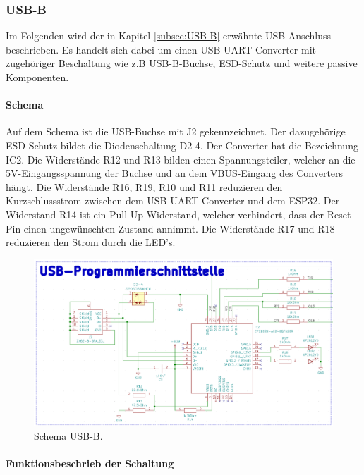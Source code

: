 \clearpage
\subsubsection{USB-B}
\label{subsubsec:USB-B}

Im Folgenden wird der in Kapitel \ref{subsec:USB-B} erwähnte USB-Anschluss beschrieben. Es handelt sich dabei um einen USB-UART-Converter mit zugehöriger Beschaltung wie z.B USB-B-Buchse, ESD-Schutz und weitere passive Komponenten.

\paragraph{Schema}\mbox{}

Auf dem Schema ist die USB-Buchse mit J2 gekennzeichnet. Der dazugehörige ESD-Schutz bildet die Diodenschaltung D2-4. Der Converter hat die Bezeichnung IC2. Die Widerstände R12 und R13 bilden einen Spannungsteiler, welcher an die 5V-Eingangsspannung der Buchse und an dem VBUS-Eingang des Converters hängt. Die Widerstände R16, R19, R10 und R11 reduzieren den Kurzschlussstrom zwischen dem USB-UART-Converter und dem ESP32. Der Widerstand R14 ist ein Pull-Up Widerstand, welcher verhindert, dass der Reset-Pin einen ungewünschten Zustand annimmt. Die Widerstände R17 und R18 reduzieren den Strom durch die LED's.

\begin{figure}[h!]
	\centering
	\includegraphics[width=1\textwidth]{graphics/Schema_USB_B}
	\caption{Schema USB-B.}
	\label{fig:Schema_USB_B}
\end{figure}

\paragraph{Funktionsbeschrieb der Schaltung}\mbox{}

